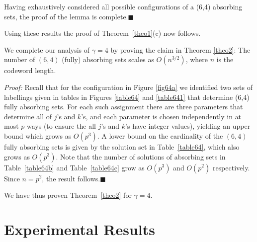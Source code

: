 {

Having exhaustively considered  all possible configurations of a
(6,4) absorbing sets, the proof of the lemma is
complete.\hfill$\blacksquare$

Using these results the proof of Theorem~\ref{theo1}(c) now
follows.

We complete our analysis of $\gamma=4$  by proving the claim in
Theorem \ref{theo2}: The number of $(6,4)$ (fully) absorbing sets
scales as $O(n^{3/2})$, where $n$ is the
codeword length.%

\noindent \textit{Proof:} Recall that for the configuration in
Figure \ref{fig64a} we identified two sets of labellings given in
tables in Figures \ref{table64} and \ref{table641} that determine
(6,4) fully absorbing sets. For each such assignment there are
three parameters that determine all of $j$'s and $k$'s, and each
parameter is chosen independently in at most $p$ ways (to ensure
the all $j$'s and $k$'s have integer values), yielding an upper
bound which grows as $O(p^3)$. A lower bound on the cardinality of
the $(6,4)$ fully absorbing sets is given by the solution set in
Table~\ref{table64}, which also grows as $O(p^3)$. Note that the
number of solutions of absorbing sets in Table~\ref{table64b} and
Table~\ref{table64c} grow as $O(p^3)$ and $O(p^2)$ respectively.
Since $n=p^2$, the result follows.\hfill$\blacksquare$

We have thus proven Theorem~\ref{theo2} for $\gamma=4$.
\section{Experimental Results}\label{exp1}

}
